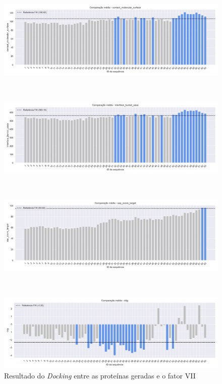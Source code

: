 \begin{figure}[htbp]
    \centering
    \begin{minipage}{0.9\textwidth}
        \centering
        \includegraphics[width=\textwidth]{figuras/plot_contact_molecular_surface.png}
    \end{minipage} \\[1ex]%
    \begin{minipage}{0.9\textwidth}
        \centering
        \includegraphics[width=\textwidth]{figuras/plot_interface_buried_sasa.png}
    \end{minipage} \\[1ex] %
    \begin{minipage}{0.9\textwidth}
        \centering
        \includegraphics[width=\textwidth]{figuras/plot_sap_score_target.png}
    \end{minipage} \\[1ex]%
    \begin{minipage}{0.9\textwidth}
        \centering
        \includegraphics[width=\textwidth]{figuras/plot_ddg.png}
    \end{minipage} 
    \caption{Resultado do \textit{Docking} entre as proteínas geradas e o fator VII}
\end{figure}